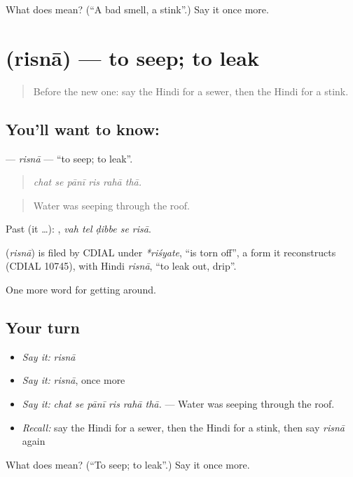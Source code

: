 \begin{tcolorbox}[breakable,colback=teal!4,colframe=teal!35!black,title={Before you move on}]
What does  mean? (\textquotedblleft{}A bad smell, a stink\textquotedblright{}.) Say it once more.
\end{tcolorbox}
\section[\texorpdfstring{\hi{रिसना} (risnā)}{रिसना (risnā)}]{ (risnā) — to seep; to leak}

\label{lesson:HI-C425-risna}



\begin{quote}
Before the new one: say the Hindi for a sewer, then the Hindi for a stink.
\end{quote}

\subsection*{You'll want to know: }
\textbf{} — \emph{risnā} — \textquotedblleft{}to seep; to leak\textquotedblright{}.

\begin{quote}
     
\end{quote}

\begin{quote}
\emph{chat se pānī ris rahā thā.}
\end{quote}

\begin{quote}
Water was seeping through the roof.
\end{quote}

Past (it …):     , \emph{vah tel ḍibbe se risā}.

\begin{cousinweb}
\textbf{} (\emph{risnā}) is filed by CDIAL under \emph{*riśyate}, \textquotedblleft{}is torn off\textquotedblright{}, a form it reconstructs (CDIAL 10745), with Hindi \emph{risnā}, \textquotedblleft{}to leak out, drip\textquotedblright{}.
\end{cousinweb}

\begin{grammarlens}[title={What you've built}]
One more word for getting around.
\end{grammarlens}

\subsection*{Your turn}
\begin{itemize}
\raggedright
  \item \emph{Say it:} \emph{risnā}
  \item \emph{Say it:} \emph{risnā}, once more
  \item \emph{Say it:} \emph{chat se pānī ris rahā thā.} — Water was seeping through the roof.
  \item \emph{Recall:} say the Hindi for a sewer, then the Hindi for a stink, then say \emph{risnā} again
\end{itemize}

\begin{tcolorbox}[breakable,colback=teal!4,colframe=teal!35!black,title={Before you move on}]
What does  mean? (\textquotedblleft{}To seep; to leak\textquotedblright{}.) Say it once more.
\end{tcolorbox}

